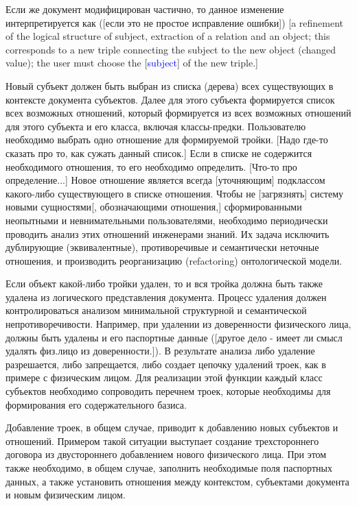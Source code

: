 \documentclass[utf8]{../IncArticle}
\newcommand{\e}[2][fcolor]{\textcolor{pcolor}{[}\textcolor{#1}{#2}\textcolor{pcolor}{]}}
\begin{document}
Если же документ модифицирован частично, то данное изменение
интерпретируется как (\e{если это не простое исправление ошибки}) \e{a refinement of the logical structure of subject, extraction of a relation and an object; this corresponds to a new triple connecting the subject to the new object (changed value); the user must choose the \e[blue]{subject} of the new triple.}

Новый субъект должен быть выбран из списка (дерева) всех существующих
в контексте документа субъектов.  Далее для этого субъекта формируется
список всех возможных отношений, который формируется из всех возможных
отношений для этого субъекта и его класса, включая классы-предки.
Пользователю необходимо выбрать одно отношение для формируемой тройки.
\e{Надо где-то сказать про то, как сужать данный список.}  Если в
списке не содержится необходимого отношения, то его необходимо
определить.  \e{Что-то про определение...}  Новое отношение является
всегда \e{уточняющим} подклассом какого-либо существующего в списке
отношения.  Чтобы не \e{загрязнять} систему новыми сущностями\e{,
обозначающими отношения,} сформированными неопытными и невнимательными
пользователями, необходимо периодически проводить анализ этих
отношений инженерами знаний.  Их задача исключить дублирующие (эквивалентные),
противоречивые и семантически неточные отношения, и производить
реорганизацию (refactoring) онтологической модели.

Если объект какой-либо тройки удален, то и вся тройка должна быть
также удалена из логического представления документа.  Процесс
удаления должен контролироваться анализом минимальной структурной и
семантической непротиворечивости.  Например, при удалении из
доверенности физического лица, должны быть удалены и его паспортные
данные (\e{другое дело - имеет ли смысл удалять физ.лицо из
  доверенности.}). В результате анализа либо удаление разрешается,
либо запрещается, либо создает цепочку удалений троек, как в примере с
физическим лицом.  Для реализации этой функции каждый класс субъектов
необходимо сопроводить перечнем троек, которые необходимы для
формирования его содержательного базиса.

Добавление троек, в общем случае, приводит к добавлению новых
субъектов и отношений.  Примером такой ситуации выступает создание
трехстороннего договора из двустороннего добавлением нового физического
лица.  При этом также необходимо, в общем случае, заполнить
необходимые поля паспортных данных, а также установить отношения между
контекстом, субъектами документа и новым физическим лицом.
\end{document}
